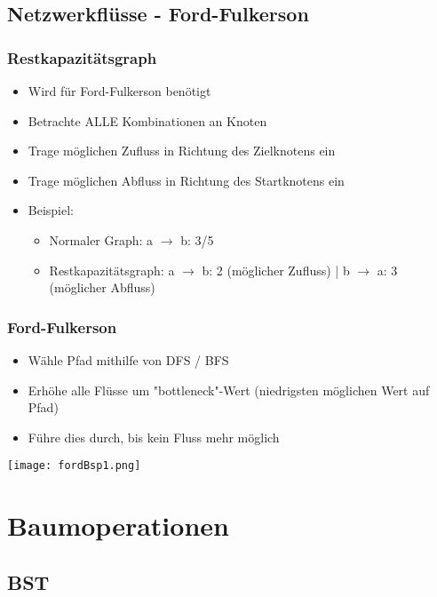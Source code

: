     \subsection{Netzwerkflüsse - Ford-Fulkerson}
        \subsubsection{Restkapazitätsgraph}
            \begin{itemize}
                \item Wird für Ford-Fulkerson benötigt
                \item Betrachte ALLE Kombinationen an Knoten
                \item Trage möglichen Zufluss in Richtung des Zielknotens ein
                \item Trage möglichen Abfluss in Richtung des Startknotens ein
                \item Beispiel:
                    \begin{itemize}
                        \item Normaler Graph: a $\rightarrow$ b: 3/5
                        \item Restkapazitätsgraph: a $\rightarrow$ b: 2 (möglicher Zufluss) | b $\rightarrow$ a: 3 (möglicher Abfluss)
                    \end{itemize}
            \end{itemize}
        
        \subsubsection{Ford-Fulkerson}
            \begin{itemize}
                \item Wähle Pfad mithilfe von DFS / BFS
                \item Erhöhe alle Flüsse um \string"bottleneck\string"-Wert (niedrigsten möglichen Wert auf Pfad)
                \item Führe dies durch, bis kein Fluss mehr möglich
            \end{itemize}
        \centerline{\texttt{[image: fordBsp1.png]}}

\section{Baumoperationen}
    \subsection{BST}
